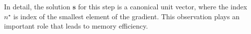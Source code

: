 \documentclass[10pt,xcolor={usenames,dvipsnames,table}]{beamer}
\def\blue{\color{blue}}
\newcommand{\T}{\!\top\!}
\DeclareMathOperator*{\minimize}{minimize}
\begin{document}
\begin{frame}
{\begin{itemize}
        In detail, the solution $\bm{s}$ for this step is a canonical unit vector, where the index $n^{\star}$ is index of the smallest element of the gradient. This observation plays an important role that leads to memory efficiency.
    \end{itemize}
    }
\end{frame}

\end{document}
